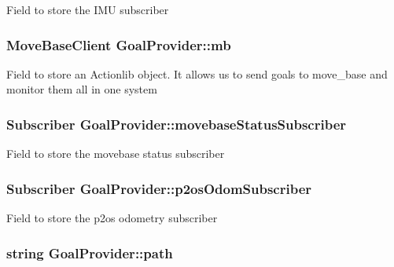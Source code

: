\-Field to store the \-I\-M\-U subscriber \hypertarget{classGoalProvider_a903cb379ce27ab3072fc273f8d344b0b}{
\subsubsection[{mb}]{\setlength{\rightskip}{0pt plus 5cm}\-Move\-Base\-Client {\bf \-Goal\-Provider\-::mb}}}\label{classGoalProvider_a903cb379ce27ab3072fc273f8d344b0b}
\-Field to store an \-Actionlib object. \-It allows us to send goals to move\-\_\-base and monitor them all in one system \hypertarget{classGoalProvider_a16a3122fd49b058c08a56e8eac93c08b}{
\subsubsection[{movebase\-Status\-Subscriber}]{\setlength{\rightskip}{0pt plus 5cm}\-Subscriber {\bf \-Goal\-Provider\-::movebase\-Status\-Subscriber}}}\label{classGoalProvider_a16a3122fd49b058c08a56e8eac93c08b}
\-Field to store the movebase status subscriber \hypertarget{classGoalProvider_a5f5494e3cd35116f170082bce82201e5}{
\subsubsection[{p2os\-Odom\-Subscriber}]{\setlength{\rightskip}{0pt plus 5cm}\-Subscriber {\bf \-Goal\-Provider\-::p2os\-Odom\-Subscriber}}}\label{classGoalProvider_a5f5494e3cd35116f170082bce82201e5}
\-Field to store the p2os odometry subscriber \hypertarget{classGoalProvider_a82146db14a5565a12fe979c68156d45c}{
\subsubsection[{path}]{\setlength{\rightskip}{0pt plus 5cm}string {\bf \-Goal\-Provider\-::path}}}\label{classGoalProvider_a82146db14a5565a12fe979c68156d45c}
